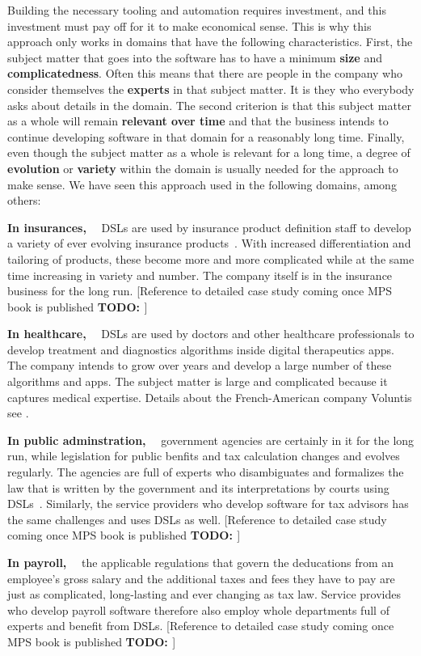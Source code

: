 \documentclass[runningheads]{llncs}
\newcommand\parhead[1]{\vspace{1mm}\noindent\textbf{{#1}}\ \ }
\newcommand\todo[1]{\vspace{1mm}\noindent\textbf{\color{red} {{TODO: {#1}} }}}
\begin{document}
Building the necessary tooling and automation requires investment, and this
investment must pay off for it to make economical sense. This is why this
approach only works in domains that have the following characteristics. First,
the subject matter that goes into the software has to have a minimum
\textbf{size} and \textbf{complicatedness}. Often this means that there are
people in the company who consider themselves the \textbf{experts} in that
subject matter. It is they who everybody asks about details in the domain.
The second criterion is that this subject matter as a whole will remain
\textbf{relevant over time} and that the business intends to continue developing
software in that domain for a reasonably long time. Finally, even though the
subject matter as a whole is relevant for a long time, a degree of
\textbf{evolution} or \textbf{variety} within the domain is usually needed for
the approach to make sense. We have seen this approach used in the following
domains, among others:

\parhead{In insurances,} DSLs are used by insurance product definition staff to develop a
variety of ever evolving insurance products~\cite{zurich}. With increased differentiation and
tailoring of products, these become more and more complicated while at the same time
increasing in variety and number. The company itself is in the insurance business for the
long run. [Reference to detailed case study coming once MPS book is published\todo{}]

\parhead{In healthcare,} DSLs are used by doctors and other healthcare
professionals to develop treatment and diagnostics algorithms inside digital
therapeutics apps. The company intends to grow over years and develop a large
number of these algorithms and apps. The subject matter is large and complicated
because it captures medical expertise. Details about the French-American company
Voluntis see \cite{voelter2019vol}.

\parhead{In public adminstration,} government agencies are certainly in it for
the long run, while legislation for public benfits and tax calculation changes
and evolves regularly. The agencies are full of experts who disambiguates and
formalizes the law that is written by the government and its interpretations by
courts using DSLs~\cite{dta}. Similarly, the service providers who
develop software for tax advisors has the same challenges and uses DSLs as well.
[Reference to detailed case study coming once MPS book is published\todo{}]

\parhead{In payroll,} the applicable regulations that govern the  
deducations from an employee's gross salary and the additional taxes and fees
they have to pay are just as complicated, long-lasting and ever changing as tax
law. Service provides who develop payroll software therefore also employ whole 
departments full of experts and benefit from DSLs. 
[Reference to detailed case study coming once MPS book is published\todo{}]
\end{document}
